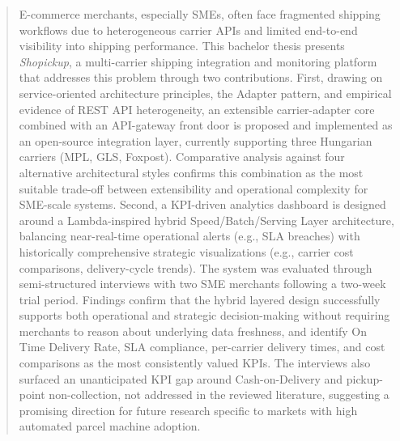 \documentclass{imc-inf}
\begin{document}
\begin{abstract}
  E-commerce merchants, especially SMEs, often face fragmented shipping workflows due to heterogeneous carrier APIs and limited end-to-end visibility into shipping performance.
  This bachelor thesis presents \textit{Shopickup}, a multi-carrier shipping integration and monitoring platform that addresses this problem through two contributions.
  First, drawing on service-oriented architecture principles, the Adapter pattern, and empirical evidence of REST API heterogeneity, an extensible carrier-adapter core combined with an API-gateway front door is proposed and implemented as an open-source integration layer, currently supporting three Hungarian carriers (MPL, GLS, Foxpost).
  Comparative analysis against four alternative architectural styles confirms this combination as the most suitable trade-off between extensibility and operational complexity for SME-scale systems.
  Second, a KPI-driven analytics dashboard is designed around a Lambda-inspired hybrid Speed/Batch/Serving Layer architecture, balancing near-real-time operational alerts (e.g., SLA breaches) with historically comprehensive strategic visualizations (e.g., carrier cost comparisons, delivery-cycle trends).
  The system was evaluated through semi-structured interviews with two SME merchants following a two-week trial period.
  Findings confirm that the hybrid layered design successfully supports both operational and strategic decision-making without requiring merchants to reason about underlying data freshness, and identify On Time Delivery Rate, SLA compliance, per-carrier delivery times, and cost comparisons as the most consistently valued KPIs.
  The interviews also surfaced an unanticipated KPI gap around Cash-on-Delivery and pickup-point non-collection, not addressed in the reviewed literature, suggesting a promising direction for future research specific to markets with high automated parcel machine adoption.
\end{abstract}


%
\tableofcontents%
\clearpage
\end{document}
